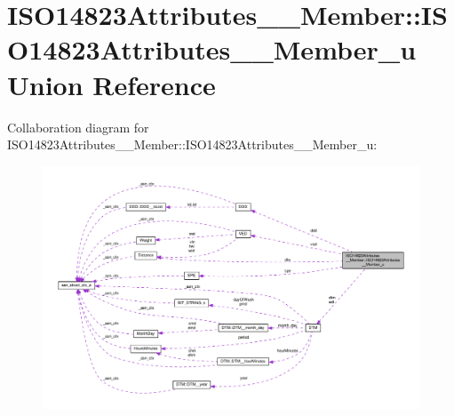 \hypertarget{unionISO14823Attributes____Member_1_1ISO14823Attributes____Member__u}{}\section{I\+S\+O14823\+Attributes\+\_\+\+\_\+\+Member\+:\+:I\+S\+O14823\+Attributes\+\_\+\+\_\+\+Member\+\_\+u Union Reference}
\label{unionISO14823Attributes____Member_1_1ISO14823Attributes____Member__u}


Collaboration diagram for I\+S\+O14823\+Attributes\+\_\+\+\_\+\+Member\+:\+:I\+S\+O14823\+Attributes\+\_\+\+\_\+\+Member\+\_\+u\+:\nopagebreak
\begin{figure}[H]
\begin{center}
\leavevmode
\includegraphics[width=350pt]{unionISO14823Attributes____Member_1_1ISO14823Attributes____Member__u__coll__graph}
\end{center}
\end{figure}
